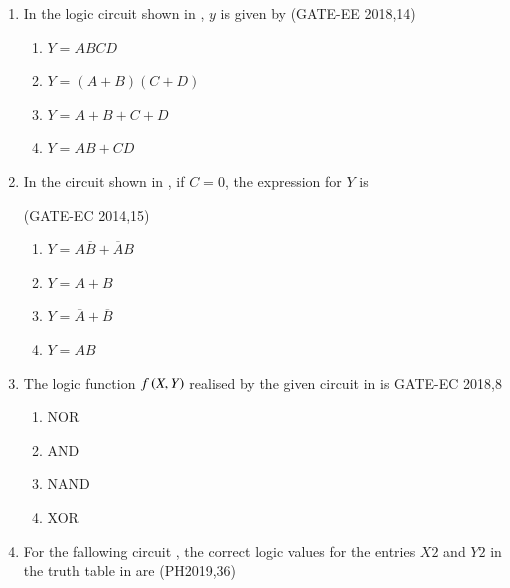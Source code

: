 \begin{enumerate}[label=\arabic*.,ref=\theenumi]
\item In the logic circuit shown in  
,
	$y$ is given by
\hfill(GATE-EE 2018,14)
\begin{figure}[H]
\centering
\resizebox{0.75\columnwidth}{!}{%

	}
	\caption{}
\label{fig:GATE-EE 2018,14}
\end{figure}
\begin{enumerate}
    \item $Y = ABCD$
    \item $Y = ( A + B)(C + D) $
    \item $Y = A +B +C+ D$
    \item $Y = AB+CD $
    
\end{enumerate}

\item In the circuit shown in 
,
 if $C = 0$, the expression for $Y$ is

\hfill (GATE-EC 2014,15)
\begin{figure}[H]
\centering
\resizebox{0.75\columnwidth}{!}{%

	}
	\caption{}
\label{fig:GATE-EC 2014,15}
\end{figure}
\begin{enumerate}
    \item $Y= A\overline{B}+ \overline{A}B $ 
    \item $Y=A+B$
    \item $Y=\overline{A}+\overline{B}$
    \item $Y=AB$
\end{enumerate}
\item The logic function $f\left(X,Y\right)$ realised by the given circuit in
is
\hfill{GATE-EC 2018,8}
\begin{figure}[H]
\centering
\resizebox{0.75\columnwidth}{!}{%

	}
	\caption{}
\label{fig:GATE-EC 2018,8}
\end{figure}
\begin{enumerate}
    \item NOR
    \item AND
    \item NAND
    \item XOR
\end{enumerate}

 
\item For the fallowing circuit
,
 the correct logic values for the entries $X2$ and $Y2$ in the truth table 
in
 are
\hfill(PH2019,36)
%
\begin{figure}[H]
        \centering
	\resizebox{0.75\columnwidth}{!}{%
        
	}
	\caption{}
\label{fig:PH2019,36}
       \end{figure}


\end{enumerate}
